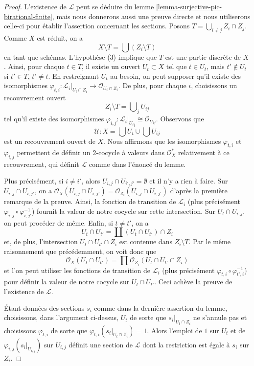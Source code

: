 \begin{proof}
L'existence de $\mathcal{L}$ peut se déduire du
lemme \ref{lemma-surjective-pic-birational-finite},
mais nous donnerons aussi une preuve directe et nous utiliserons
celle-ci pour établir l'assertion concernant les sections.
Posons $T = \bigcup_{i \not = j} Z_i \cap Z_j$. Comme $X$ est réduit, on a
$$
X \setminus T = \bigcup (Z_i \setminus T)
$$
en tant que schémas. L'hypothèse (3) implique que $T$ est une partie discrète de $X$.
Ainsi, pour chaque $t \in T$, il existe un ouvert $U_t \subset X$
tel que $t \in U_t$, mais $t' \not \in U_t$ si $t' \in T$, $t' \not = t$.
En restreignant $U_t$ au besoin, on peut supposer qu'il existe des isomorphismes
$\varphi_{t, i} : \mathcal{L}_i|_{U_t \cap Z_i} \to
\mathcal{O}_{U_t \cap Z_i}$. De plus, pour chaque $i$, choisissons un recouvrement ouvert
$$
Z_i \setminus T = \bigcup\nolimits_j U_{ij}
$$
tel qu'il existe des isomorphismes
$\varphi_{i, j} : \mathcal{L}_i|_{U_{ij}} \cong \mathcal{O}_{U_{ij}}$.
Observons que
$$
\mathcal{U} : X = \bigcup U_t \cup \bigcup U_{ij}
$$
est un recouvrement ouvert de $X$. Nous affirmons que les isomorphismes
$\varphi_{t, i}$ et $\varphi_{i, j}$ permettent de définir un $2$-cocycle à valeurs
dans $\mathcal{O}_X^*$ relativement à ce recouvrement, qui définit $\mathcal{L}$ comme
dans l'énoncé du lemme.

\medskip\noindent
Plus précisément, si $i \not = i'$, alors $U_{i, j} \cap U_{i', j'} = \emptyset$
et il n'y a rien à faire. Sur $U_{i, j} \cap U_{i, j'}$, on a
$\mathcal{O}_X(U_{i, j} \cap U_{i, j'}) =
\mathcal{O}_{Z_i}(U_{i, j} \cap U_{i, j'})$ d'après la première remarque de la preuve.
Ainsi, la fonction de transition de $\mathcal{L}_i$ (plus précisément
$\varphi_{i, j} \circ \varphi_{i, j'}^{-1}$) fournit la valeur de notre
cocycle sur cette intersection.
Sur $U_t \cap U_{i, j}$, on peut procéder de même.
Enfin, si $t \not = t'$, on a
$$
U_t \cap U_{t'} = \coprod (U_t \cap U_{t'}) \cap Z_i
$$
et, de plus, l'intersection $U_t \cap U_{t'} \cap Z_i$ est contenue
dans $Z_i \setminus T$. Par le même raisonnement que précédemment, on voit donc que
$$
\mathcal{O}_X(U_t \cap U_{t'}) =
\prod \mathcal{O}_{Z_i}(U_t \cap U_{t'} \cap Z_i)
$$
et l'on peut utiliser les fonctions de transition de $\mathcal{L}_i$ (plus précisément
$\varphi_{t, i} \circ \varphi_{t', i}^{-1}$) pour définir la valeur de
notre cocycle sur $U_t \cap U_{t'}$. Ceci achève la preuve de l'existence
de $\mathcal{L}$.

\medskip\noindent
Étant données des sections $s_i$ comme dans la dernière assertion du lemme, choisissons,
dans l'argument ci-dessus, $U_t$ de sorte que $s_i|_{U_t \cap Z_i}$ ne s'annule pas et
choisissons $\varphi_{t, i}$ de sorte que $\varphi_{t, i}(s_i|_{U_t \cap Z_i}) = 1$.
Alors l'emploi de $1$ sur $U_t$ et de $\varphi_{i, j}(s_i|_{U_{i, j}})$ sur
$U_{i, j}$ définit une section de $\mathcal{L}$ dont la restriction
est égale à $s_i$ sur $Z_i$.
\end{proof}

